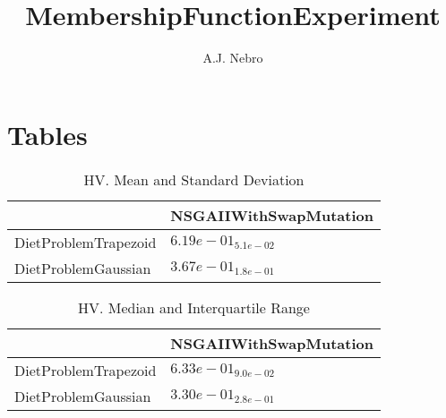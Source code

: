 \documentclass{article}
\title{MembershipFunctionExperiment}
\author{A.J. Nebro}
\begin{document}
\maketitle
\section{Tables}

\begin{table}
\caption{HV. Mean and Standard Deviation}
\label{table: HV}
\centering
\begin{scriptsize}
\begin{tabular}{ll}
\hline &  NSGAIIWithSwapMutation\\
\hline 
DietProblemTrapezoid & \cellcolor{gray95}$  6.19e-01_{ 5.1e-02}$ \\
DietProblemGaussian & \cellcolor{gray95}$  3.67e-01_{ 1.8e-01}$ \\
\hline
\end{tabular}
\end{scriptsize}
\end{table}

\begin{table}
\caption{HV. Median and Interquartile Range}
\label{table: HV}
\centering
\begin{scriptsize}
\begin{tabular}{ll}
\hline &  NSGAIIWithSwapMutation\\
\hline 
DietProblemTrapezoid & \cellcolor{gray95}$  6.33e-01_{ 9.0e-02}$ \\
DietProblemGaussian & \cellcolor{gray95}$  3.30e-01_{ 2.8e-01}$ \\
\hline
\end{tabular}
\end{scriptsize}
\end{table}
\end{document}

